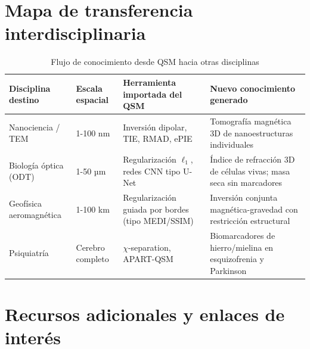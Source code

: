 \documentclass[12pt, a4paper]{article}
\begin{document}
\section{Mapa de transferencia interdisciplinaria}

\begin{table}[h!]
  \centering
  \caption{Flujo de conocimiento desde QSM hacia otras disciplinas}
  \renewcommand{\arraystretch}{1.3}
  \begin{tabular}{p{3.2cm} p{3.0cm} p{3.5cm} p{3.5cm}}
    \toprule
    \textbf{Disciplina destino} & \textbf{Escala espacial} & \textbf{Herramienta importada del QSM} & \textbf{Nuevo conocimiento generado} \\
    \midrule
    Nanociencia / TEM & 1-100 nm & Inversión dipolar, TIE, RMAD, ePIE & Tomografía magnética 3D de nanoestructuras individuales \\
    \midrule
    Biología óptica (ODT) & 1-50 µm & Regularización $\ell_1$, redes CNN tipo U-Net & Índice de refracción 3D de células vivas; masa seca sin marcadores \\
    \midrule
    Geofísica aeromagnética & 1-100 km & Regularización guiada por bordes (tipo MEDI/SSIM) & Inversión conjunta magnética-gravedad con restricción estructural \\
    \midrule
    Psiquiatría & Cerebro completo & $\chi$-separation, APART-QSM & Biomarcadores de hierro/mielina en esquizofrenia y Parkinson \\
    \bottomrule
  \end{tabular}
\end{table}

\section{Recursos adicionales y enlaces de interés}
\end{document}
